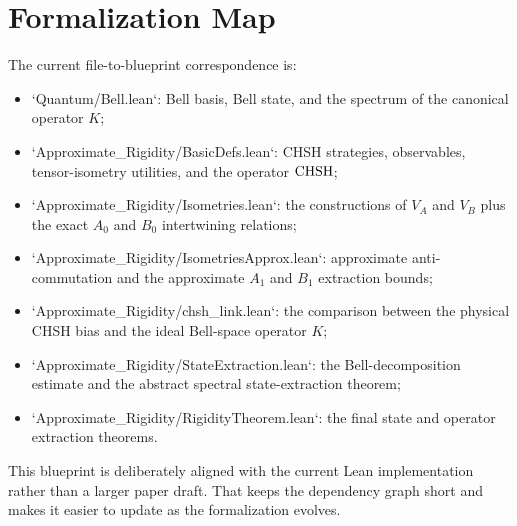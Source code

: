 \section{Formalization Map}

The current file-to-blueprint correspondence is:

\begin{itemize}
\item `Quantum/Bell.lean`: Bell basis, Bell state, and the spectrum of the canonical operator $K$;
\item `Approximate_Rigidity/BasicDefs.lean`: CHSH strategies, observables, tensor-isometry utilities, and the operator $\mathrm{CHSH}$;
\item `Approximate_Rigidity/Isometries.lean`: the constructions of $V_A$ and $V_B$ plus the exact $A_0$ and $B_0$ intertwining relations;
\item `Approximate_Rigidity/IsometriesApprox.lean`: approximate anti-commutation and the approximate $A_1$ and $B_1$ extraction bounds;
\item `Approximate_Rigidity/chsh_link.lean`: the comparison between the physical CHSH bias and the ideal Bell-space operator $K$;
\item `Approximate_Rigidity/StateExtraction.lean`: the Bell-decomposition estimate and the abstract spectral state-extraction theorem;
\item `Approximate_Rigidity/RigidityTheorem.lean`: the final state and operator extraction theorems.
\end{itemize}

This blueprint is deliberately aligned with the current Lean implementation rather than a larger paper draft.
That keeps the dependency graph short and makes it easier to update as the formalization evolves.
